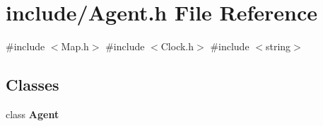 \section{include/\+Agent.h File Reference}
\label{_agent_8h}
{\ttfamily \#include $<$Map.\+h$>$}\newline
{\ttfamily \#include $<$Clock.\+h$>$}\newline
{\ttfamily \#include $<$string$>$}\newline
\subsection*{Classes}
\begin{DoxyCompactItemize}
\item 
class \textbf{ Agent}
\end{DoxyCompactItemize}
